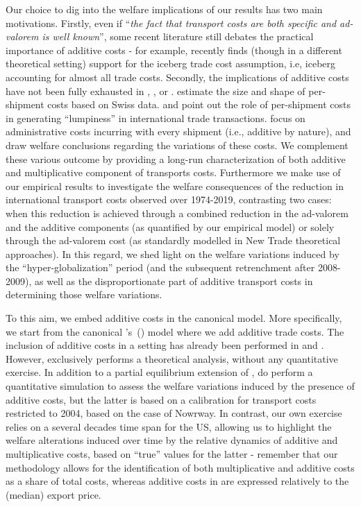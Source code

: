 \documentclass[a4paper,11pt]{article}
\newcommand\cites[1]{\citeauthor{#1}'s\ (\citeyear{#1})}
\begin{document}
Our choice to dig into the welfare implications of our results has two main motivations. Firstly, even if ``\emph{the fact that transport costs are both specific and ad-valorem is well known}'', some recent literature still debates the practical importance of additive costs - for example, \cite{Lashkaripour_JIE2020} recently finds (though in a different theoretical setting) support for the iceberg trade cost assumption, i.e, iceberg accounting for almost all trade costs. Secondly, the implications of additive costs have not been fully exhausted in \citet{Irrazabal_2015}, \cite{Hornok-et-al-RES-2015, Hornok-et-al-JIE-2015}, \cite{Alessandria-et-al-AER-2010} or \citet{sorensen2014}. \cite{Kropf-Saure-JIE-2016} estimate the size and shape of per-shipment costs based on Swiss data. \cite{Alessandria-et-al-AER-2010} and \cite{Hornok-et-al-RES-2015} point out the role of per-shipment costs in generating ``lumpiness'' in international trade transactions. \cite{Hornok-et-al-JIE-2015} focus on administrative costs incurring with every shipment (i.e., additive by nature), and draw welfare conclusions regarding the variations of these costs. We complement these various outcome by providing a long-run characterization of both additive and multiplicative component of transports costs. Furthermore we make use of our empirical results to investigate the welfare consequences of the reduction in international transport costs observed over 1974-2019, contrasting two cases: when this reduction is achieved through a combined reduction in the ad-valorem and the additive components (as quantified by our empirical model) or solely through the ad-valorem cost (as standardly modelled in New Trade theoretical approaches). In this regard, we shed light on the welfare variations induced by the ``hyper-globalization'' period (and the subsequent retrenchment after 2008-2009), as well as the disproportionate part of additive transport costs in determining those welfare variations. 

To this aim, we embed additive costs in the canonical \citet{melitz} model. More specifically, we start from the canonical \cites{melitz} model where we add additive trade costs. The inclusion of additive costs in a \citet{melitz} setting has already been performed in \citet{sorensen2014} and \citet{Irrazabal_2015}. However, \citet{sorensen2014} exclusively performs a theoretical analysis, without any quantitative exercise. In addition to a partial equilibrium extension of \citet{melitz}, \citet{Irrazabal_2015} do perform a quantitative simulation to assess the welfare variations induced by the presence of additive costs, but the latter is based on a calibration for transport costs restricted to 2004, based on the case of Nowrway. In contrast, our own exercise relies on a several decades time span for the US, allowing us to highlight the welfare alterations induced over time by the relative dynamics of additive and multiplicative costs, based on ``true'' values for the latter - remember that our methodology allows for the identification of both multiplicative and additive costs as a share of total costs, whereas additive costs in \citet{Irrazabal_2015} are expressed relatively to the (median) export price. 
\end{document}
